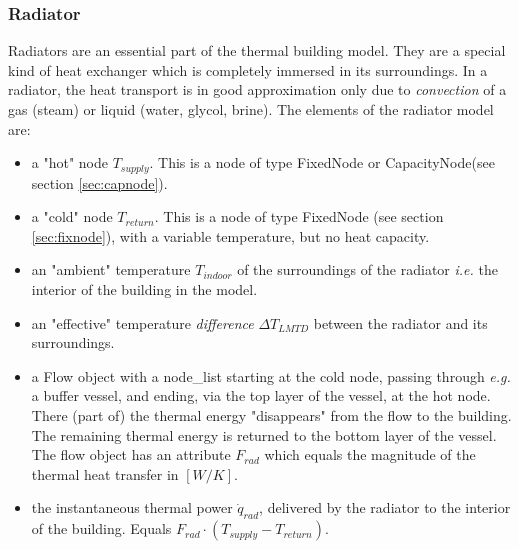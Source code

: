 \subsubsection{Radiator}

Radiators are an essential part of the thermal building model. They are a special kind of heat exchanger which is completely immersed in its surroundings. In a radiator, the heat transport is in good approximation only due to \emph{convection} of a gas (steam) or liquid (water, glycol, brine). The elements of the radiator model are:

\begin{itemize}
	\item a "hot" node $T_{supply}$. This is a node of type \textsf{FixedNode} or \textsf{CapacityNode}(see section \ref{sec:capnode}).
	\item a "cold" node $T_{return}$. This is a node of type \textsf{FixedNode} (see section \ref{sec:fixnode}), with a variable temperature, but no heat capacity.
	\item an "ambient" temperature $T_{indoor}$ of the surroundings of the radiator \textit{i.e.} the interior of the building in the model.
	\item an "effective" temperature \emph{difference} $\Delta T_{LMTD}$ between the radiator and its surroundings. 
	\item a \textsf{Flow} object with a \textsf{node\_list} starting at the cold node, passing through \textit{e.g.} a buffer vessel, and ending, via the top layer of the vessel, at the hot node. There (part of) the thermal energy "disappears" from the flow to the building. The remaining thermal energy is returned to the bottom layer of the vessel. The flow object has an attribute $F_{rad}$ which equals the magnitude of the thermal heat transfer in $[W/K]$.
	\item the instantaneous thermal power $\dot{q}_{rad}$, delivered by the radiator to the interior of the building. Equals $F_{rad} \cdot (T_{supply} - T_{return})$.
\end{itemize} 

